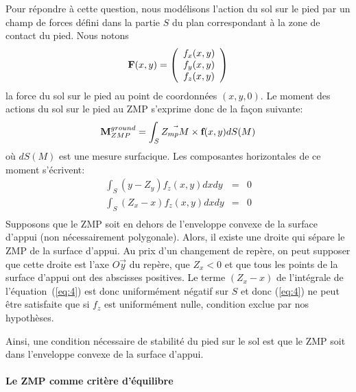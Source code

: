 Pour répondre à cette question, nous modélisons l'action du sol sur le
pied par un champ de forces défini dans la partie $S$ du plan
correspondant à la zone de contact du pied. Nous notons
$$
\textbf{F}(x,y) = \left(\begin{array}{c}
f_x(x,y) \\ f_y(x,y) \\ f_z(x,y)
\end{array}\right)
$$
la force du sol sur le pied au point de coordonnées $(x,y,0)$. Le moment des actions du sol sur le pied au
ZMP s'exprime donc de la façon suivante:
\begin{eqnarray*}
\textbf{M}^{ground}_{ZMP} = \int_S \vec{Z_{mp}M} \times \textbf{f}(x,y) dS(M)
\end{eqnarray*}
où $dS(M)$ est une mesure surfacique.
Les composantes horizontales de ce moment s'écrivent:
\begin{eqnarray}\label{eq:3}
  \int_S (y-Z_y)f_z(x,y) dx dy &=& 0 \\
  \label{eq:4}
  \int_S (Z_x-x)f_z(x,y) dx dy &=& 0 \\
\end{eqnarray}
Supposons que le ZMP soit en dehors de l'enveloppe convexe de la
surface d'appui (non nécessairement polygonale). Alors, il existe une
droite qui sépare le ZMP de la surface d'appui. Au prix d'un
changement de repère, on peut supposer que cette droite est l'axe
$O\vec{y}$ du repère, que $Z_x < 0$ et que tous les points de la
surface d'appui ont des abscisses positives. Le terme $(Z_x-x)$ de
l'intégrale de l'équation (\ref{eq:4}) est donc uniformément négatif
sur $S$ et donc (\ref{eq:4}) ne peut être satisfaite que si $f_z$ est
uniformément nulle, condition exclue par nos hypothèses.

Ainsi, une condition nécessaire de stabilité du pied sur le sol est
que le ZMP soit dans l'enveloppe convexe de la surface d'appui.


\paragraph{Le ZMP comme critère d'équilibre}

